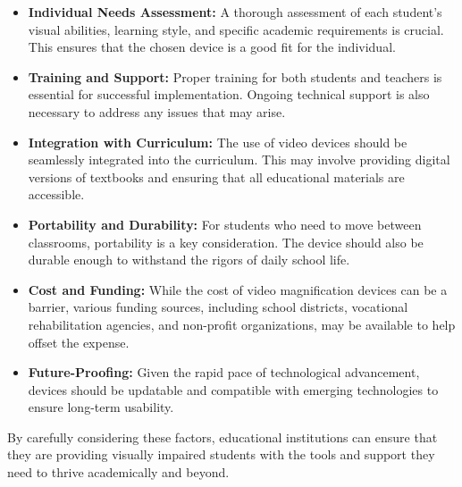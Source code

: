 \begin{itemize}
	\item \textbf{Individual Needs Assessment:} A thorough assessment of each student's visual abilities, learning style, and specific academic requirements is crucial. This ensures that the chosen device is a good fit for the individual.
	\item \textbf{Training and Support:} Proper training for both students and teachers is essential for successful implementation. Ongoing technical support is also necessary to address any issues that may arise.
	\item \textbf{Integration with Curriculum:} The use of video  devices should be seamlessly integrated into the curriculum. This may involve providing digital versions of textbooks and ensuring that all educational materials are accessible.
	\item \textbf{Portability and Durability:} For students who need to move between classrooms, portability is a key consideration. The device should also be durable enough to withstand the rigors of daily school life.
	\item \textbf{Cost and Funding:} While the cost of video magnification devices can be a barrier, various funding sources, including school districts, vocational rehabilitation agencies, and non-profit organizations, may be available to help offset the expense.
	\item \textbf{Future-Proofing:} Given the rapid pace of technological advancement, devices should be updatable and compatible with emerging technologies to ensure long-term usability.
\end{itemize}

By carefully considering these factors, educational institutions can ensure that they are providing visually impaired students with the tools and support they need to thrive academically and beyond.
